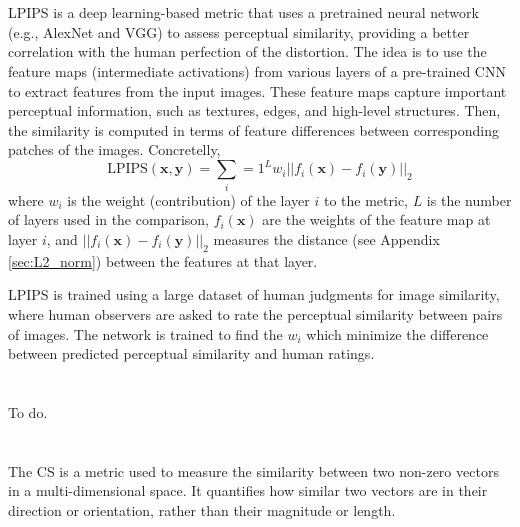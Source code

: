 
\section{}

\acrshort{LPIPS} \cite{zhang2018unreasonable} is a deep learning-based
metric that uses a pretrained neural network (e.g., AlexNet and VGG)
to assess perceptual similarity, providing a better correlation with
the human perfection of the distortion. The idea is to use the feature
maps (intermediate activations) from various layers of a pre-trained
\gls{CNN} to extract features from the input images. These feature maps
capture important perceptual information, such as textures, edges, and
high-level structures. Then, the similarity is computed in terms of
feature differences between corresponding patches of the
images. Concretelly,
\begin{equation}
  \text{LPIPS}(\mathbf{x}, \mathbf{y}) = \sum_i=1^Lw_i||f_i(\mathbf{x}) - f_i(\mathbf{y})||_2
\end{equation}
where $w_i$ is the weight (contribution) of the layer $i$ to the
metric, $L$ is the number of layers used in the comparison,
$f_i(\mathbf{x})$ are the weights of the feature map at layer $i$, and
$||f_i(\mathbf{x}) - f_i(\mathbf{y})||_2$ measures the distance (see
Appendix \ref{sec:L2_norm}) between the features at that layer.

\gls{LPIPS} is trained using a large dataset of human judgments for image
similarity, where human observers are asked to rate the perceptual
similarity between pairs of images. The network is trained to find the
$w_i$ which minimize the difference between predicted perceptual
similarity and human ratings.


\section{}

To do.


\section{}
The \acrshort{CS} is a metric used to measure the similarity between
two non-zero vectors in a multi-dimensional space. It quantifies how
similar two vectors are in their direction or orientation, rather than
their magnitude or length.

